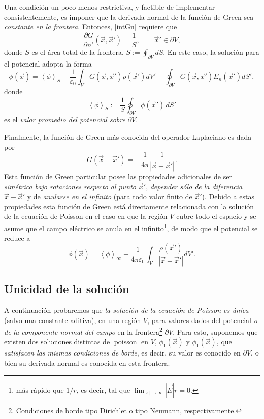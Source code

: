 Una condición un poco menos restrictiva, y factible de implementar consistentemente, es imponer que la derivada normal de la función de Green sea \textit{constante en la frontera}. Entonces, \eqref{intGn} requiere que
\begin{equation}
\frac{\partial G}{\partial n'}(\vec{x},\vec{x}')=\frac{1}{S}, \qquad \vec{x}'\in\partial V,
\end{equation}
donde $S$ es el área total de la frontera, $S:=\oint_{\partial V} dS$. En este caso, la solución para el potencial adopta la forma
\begin{equation}
\phi(\vec{x})= \left\langle\phi\right\rangle_S-\frac{1}{\varepsilon_0}\int_VG(\vec{x},\vec{x}') \rho(\vec{x}')dV'+\oint_{\partial V}G(\vec{x},\vec{x}')E_n(\vec{x}')dS',
\end{equation}
donde
\begin{equation}
\left\langle\phi\right\rangle_S:=\frac{1}{S}\oint_{\partial V}\phi(\vec{x}')\,dS'
\end{equation}
es el \textit{valor promedio del potencial sobre} $\partial V$.

Finalmente, la función de Green más conocida del operador Laplaciano es dada por
\begin{equation}
G(\vec{x}-\vec{x}')=-\frac{1}{4\pi}\frac{1}{|\vec{x}-\vec{x}'|}.
\end{equation}
Esta función de Green particular posee las propiedades adicionales de ser \textit{simétrica bajo rotaciones respecto al punto $\vec{x}'$}, \textit{depender sólo de la diferencia $\vec{x}-\vec{x}'$} y de \textit{anularse en el infinito} (para todo valor finito de $\vec{x}'$). Debido a estas propiedades esta función de Green está directamente relacionada con la solución de la ecuación de Poisson en el caso en que la región $V$ cubre todo el espacio y se asume que el campo eléctrico se anula en el infinito\footnote{más rápido que $1/r$, es decir, tal que $\lim_{|x|\to\infty}|\vec{E}|r=0$.}, de modo que el potencial se reduce a
\begin{equation}
\phi(\vec{x})= \left\langle\phi\right\rangle_\infty+\frac{1}{4\pi\varepsilon_0}\int_V\frac{\rho(\vec{x}')}{|\vec{x}-\vec{x}'|}dV'.
\end{equation}

\subsection{Unicidad de la solución}\label{sec:uniP}
A continuación probaremos que \textit{la solución de la ecuación de Poisson es única} (salvo una constante aditiva), en una región $V$, para valores dados del potencial \textit{o de la componente normal del campo} en la frontera\footnote{Condiciones de borde tipo Dirichlet o tipo Neumann, respectivamente.} $\partial V$. Para esto, suponemos que existen dos soluciones distintas de \eqref{poisson} en $V$, $\phi_1(\vec{x})$ y $\phi_1(\vec{x})$, que \textit{satisfacen las mismas condiciones de borde}, es decir, su valor es conocido en $\partial V$, o bien su derivada normal es conocida en esta frontera.

